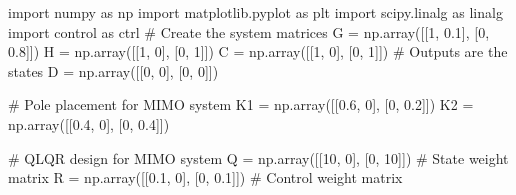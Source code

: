 \documentclass[
  letterpaper,
  DIV=11,
  numbers=noendperiod,
  oneside]{scrartcl}
\newenvironment{Shaded}{\begin{snugshade}}{\end{snugshade}}
\newcommand{\CommentTok}[1]{\textcolor[rgb]{0.37,0.37,0.37}{#1}}
\newcommand{\DecValTok}[1]{\textcolor[rgb]{0.68,0.00,0.00}{#1}}
\newcommand{\FloatTok}[1]{\textcolor[rgb]{0.68,0.00,0.00}{#1}}
\newcommand{\ImportTok}[1]{\textcolor[rgb]{0.00,0.46,0.62}{#1}}
\newcommand{\NormalTok}[1]{\textcolor[rgb]{0.00,0.23,0.31}{#1}}
\newcommand{\OperatorTok}[1]{\textcolor[rgb]{0.37,0.37,0.37}{#1}}
\begin{document}
\begin{Shaded}
\begin{Highlighting}[numbers=left,,]
\ImportTok{import}\NormalTok{ numpy }\ImportTok{as}\NormalTok{ np}
\ImportTok{import}\NormalTok{ matplotlib.pyplot }\ImportTok{as}\NormalTok{ plt}
\ImportTok{import}\NormalTok{ scipy.linalg }\ImportTok{as}\NormalTok{ linalg}
\ImportTok{import}\NormalTok{ control }\ImportTok{as}\NormalTok{ ctrl}
\CommentTok{\# Create the system matrices}
\NormalTok{G }\OperatorTok{=}\NormalTok{ np.array([[}\DecValTok{1}\NormalTok{, }\FloatTok{0.1}\NormalTok{], [}\DecValTok{0}\NormalTok{, }\FloatTok{0.8}\NormalTok{]])}
\NormalTok{H }\OperatorTok{=}\NormalTok{ np.array([[}\DecValTok{1}\NormalTok{, }\DecValTok{0}\NormalTok{], [}\DecValTok{0}\NormalTok{, }\DecValTok{1}\NormalTok{]])}
\NormalTok{C }\OperatorTok{=}\NormalTok{ np.array([[}\DecValTok{1}\NormalTok{, }\DecValTok{0}\NormalTok{], [}\DecValTok{0}\NormalTok{, }\DecValTok{1}\NormalTok{]]) }\CommentTok{\# Outputs are the states}
\NormalTok{D }\OperatorTok{=}\NormalTok{ np.array([[}\DecValTok{0}\NormalTok{, }\DecValTok{0}\NormalTok{], [}\DecValTok{0}\NormalTok{, }\DecValTok{0}\NormalTok{]])}

\CommentTok{\# Pole placement for MIMO system}
\NormalTok{K1 }\OperatorTok{=}\NormalTok{ np.array([[}\FloatTok{0.6}\NormalTok{, }\DecValTok{0}\NormalTok{], [}\DecValTok{0}\NormalTok{, }\FloatTok{0.2}\NormalTok{]]) }
\NormalTok{K2 }\OperatorTok{=}\NormalTok{ np.array([[}\FloatTok{0.4}\NormalTok{, }\DecValTok{0}\NormalTok{], [}\DecValTok{0}\NormalTok{, }\FloatTok{0.4}\NormalTok{]]) }

\CommentTok{\# QLQR design for MIMO system}
\NormalTok{Q }\OperatorTok{=}\NormalTok{ np.array([[}\DecValTok{10}\NormalTok{, }\DecValTok{0}\NormalTok{], [}\DecValTok{0}\NormalTok{, }\DecValTok{10}\NormalTok{]]) }\CommentTok{\# State weight matrix}
\NormalTok{R }\OperatorTok{=}\NormalTok{ np.array([[}\FloatTok{0.1}\NormalTok{, }\DecValTok{0}\NormalTok{], [}\DecValTok{0}\NormalTok{, }\FloatTok{0.1}\NormalTok{]]) }\CommentTok{\# Control weight matrix}


\end{Highlighting}
\end{Shaded}
\end{document}
